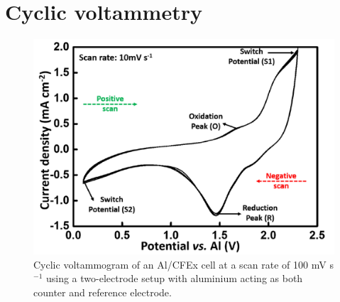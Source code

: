 \section{Cyclic voltammetry}
\begin{figure}[tbh!]
\centering
\includegraphics[width=\textwidth]{Figures/chap2fig/CV}
\caption{Cyclic voltammogram of an Al/CFEx cell at a scan rate of 100 mV s$^{-1}$ using a two-electrode setup with aluminium acting as both counter and reference electrode. }
\label{Figures/chap2fig:CV}
\end{figure}

